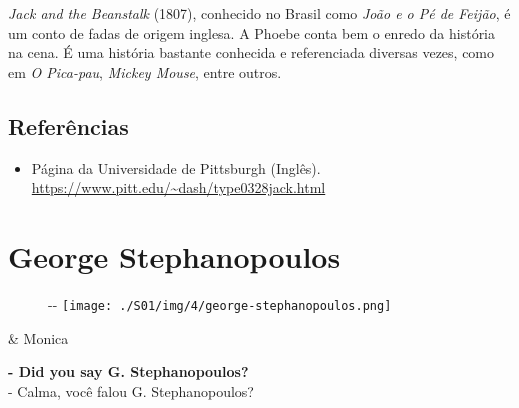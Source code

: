 \emph{Jack and the Beanstalk} (1807), conhecido no Brasil como
\emph{João e o Pé de Feijão}, é um conto de fadas de origem inglesa. A
Phoebe conta bem o enredo da história na cena. É uma história bastante
conhecida e referenciada diversas vezes, como em \emph{O Pica-pau},
\emph{Mickey Mouse}, entre outros.

\hypertarget{referuxeancias-2}{%
\subsection{Referências}\label{referuxeancias-2}}

\begin{itemize}
\tightlist
\item
  \sloppy Página da Universidade de Pittsburgh (Inglês). \url{https://www.pitt.edu/~dash/type0328jack.html}
\end{itemize}

\hypertarget{george-stephanopoulos}{%
\section{George Stephanopoulos}\label{george-stephanopoulos}}

\begin{figure}[!ht]
  \begin{adjustwidth}{-\oddsidemargin-1in}{-\rightmargin}
    \centering
    \texttt{[image: ./S01/img/4/george-stephanopoulos.png]}
  \end{adjustwidth}
\end{figure}

\begin{tcolorbox}[enhanced,center upper,
    drop fuzzy shadow southeast, boxrule=0.3pt,
    lower separated=false,
    colframe=black!30!dialogoBorder,colback=white]
\begin{minipage}[c]{0.16\linewidth}
   & \centering \scriptsize{Monica}
\end{minipage}
\hfill
\begin{minipage}[c]{0.8\linewidth}
  \textbf{- Did you say G. Stephanopoulos?}\\
  - Calma, você falou G. Stephanopoulos?
\end{minipage}
\end{tcolorbox}

